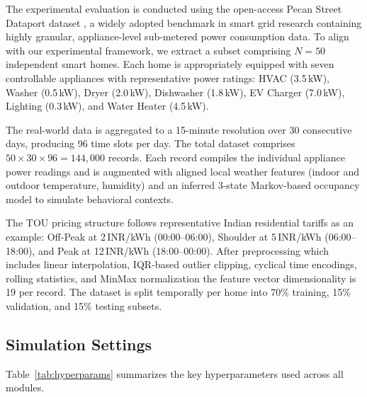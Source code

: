 \documentclass[journal]{IEEEtran}
\begin{document}
The experimental evaluation is conducted using the open-access Pecan Street Dataport dataset \cite{pecanstreet}, a widely adopted benchmark in smart grid research containing highly granular, appliance-level sub-metered power consumption data. To align with our experimental framework, we extract a subset comprising $N = 50$ independent smart homes. Each home is appropriately equipped with seven controllable appliances with representative power ratings: HVAC (3.5\,kW), Washer (0.5\,kW), Dryer (2.0\,kW), Dishwasher (1.8\,kW), EV Charger (7.0\,kW), Lighting (0.3\,kW), and Water Heater (4.5\,kW).

The real-world data is aggregated to a 15-minute resolution over 30 consecutive days, producing 96 time slots per day. The total dataset comprises $50 \times 30 \times 96 = 144{,}000$ records. Each record compiles the individual appliance power readings and is augmented with aligned local weather features (indoor and outdoor temperature, humidity) and an inferred 3-state Markov-based occupancy model to simulate behavioral contexts.

The TOU pricing structure follows representative Indian residential tariffs as an example: Off-Peak at 2\,INR/kWh (00:00--06:00), Shoulder at 5\,INR/kWh (06:00--18:00), and Peak at 12\,INR/kWh (18:00--00:00). After preprocessing which includes linear interpolation, IQR-based outlier clipping, cyclical time encodings, rolling statistics, and MinMax normalization the feature vector dimensionality is 19 per record. The dataset is split temporally per home into 70\% training, 15\% validation, and 15\% testing subsets.

\subsection{Simulation Settings}

Table~\ref{tab:hyperparams} summarizes the key hyperparameters used across all modules.
\end{document}
